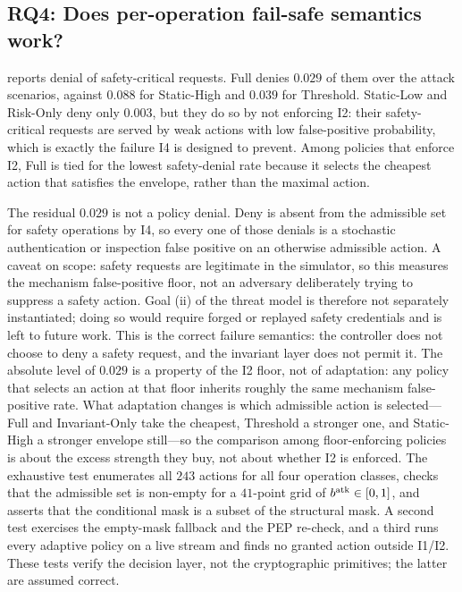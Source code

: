 


\subsection{RQ4: Does per-operation fail-safe semantics work?}
\label{sec:rq4}

 reports denial of safety-critical requests. Full denies
$0.029$ of them over the attack scenarios, against $0.088$ for Static-High and
$0.039$ for Threshold. Static-Low and Risk-Only deny only $0.003$, but they do so
by not enforcing I2: their safety-critical requests are served by weak actions
with low false-positive probability, which is exactly the failure I4 is designed
to prevent. Among policies that enforce I2, Full is tied for the lowest
safety-denial rate because it selects the cheapest action that satisfies the
envelope, rather than the maximal action.

The residual $0.029$ is not a policy denial. Deny is absent from the admissible
set for safety operations by I4, so every one of those denials is a stochastic
authentication or inspection false positive on an otherwise admissible action.
A caveat on scope: safety requests are legitimate in the simulator, so this
measures the mechanism false-positive floor, not an adversary deliberately
trying to suppress a safety action. Goal (ii) of the threat model is therefore
not separately instantiated; doing so would require forged or replayed safety
credentials and is left to future work.
This is the correct failure semantics: the controller does not choose to deny a
safety request, and the invariant layer does not permit it. The absolute level of
$0.029$ is a property of the I2 floor, not of adaptation: any policy that selects
an action at that floor inherits roughly the same mechanism false-positive rate.
What adaptation changes is which admissible action is selected---Full and
Invariant-Only take the cheapest, Threshold a stronger one, and Static-High a
stronger envelope still---so the comparison among floor-enforcing policies is
about the excess strength they buy, not about whether I2 is enforced. The exhaustive
test enumerates all $243$ actions for all four operation classes, checks that the
admissible set is non-empty for a $41$-point grid of $b^{\mathrm{atk}}\in[0,1]$, and
asserts that the conditional mask is a subset of the structural mask. A second
test exercises the empty-mask fallback and the PEP re-check, and a third runs
every adaptive policy on a live stream and finds no granted action outside I1/I2.
These tests verify the decision layer, not the cryptographic primitives; the
latter are assumed correct.

